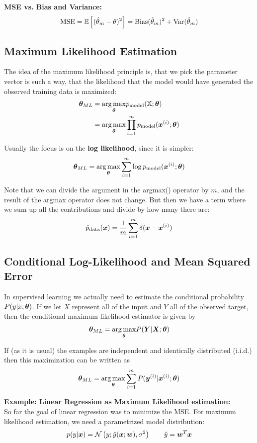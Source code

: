 \begin{multicols}{2}
	\textbf{MSE vs. Bias and Variance:}
	\[ \text{MSE} = \mathbb{E}\left[(\hat{\theta}_m-\theta)^2\right] = \text{Bias}(\hat{\theta}_m)^2+\text{Var}(\hat{\theta}_m) \]
		
		
	\subsection{Maximum Likelihood Estimation}
	The idea of the maximum likelihood principle is, that we pick the parameter vector is such a way, that the likelihood that the model would have generated the observed training data is maximized:
	\begin{align*}
	\bol{\theta}_{ML}
	&= \underset{\bol{\theta}}{\arg \max} p_{\text{model}} (\mathbb{X};\bol{\theta})\\
	&= \underset{\bol{\theta}}{\arg \max} \prod_{i=1}^{m} p_{\text{model}} (\bol{x}^{(i)};\bol{\theta})
	\end{align*}
	
	Usually the focus is on the \textbf{log likelihood}, since it is simpler:
	\[\bol{\theta}_{ML} = \underset{\bol{\theta}}{\arg \max} \sum_{i=1}^{m} \log p_{\text{model}} (\bol{x}^{(i)};\bol{\theta}) \]
	
	Note that we can divide the argument in the argmax() operator by $m$, and the result of the argmax operator does not change. But then we have a term where we sum up all the contributions and divide by how many there are:
	\[ \hat{p}_{\text{data}}(\bol{x}) = \frac{1}{m} \sum_{i=1}^{m} \delta(\bol{x}-\bol{x}^{(i)}) \]
	
	\subsection{Conditional Log-Likelihood and Mean Squared Error}
	In supervised learning we actually need to estimate the conditional probability $P(y|x;\bol{\theta})$.
	If we let $X$ represent all of the input and $Y$ all of the observed target, then the conditional maximum likelihood estimator is given by
	\[ \bol{\theta}_{ML} = \underset{\bol{\theta}}{\arg \max} P(\bol{Y}|\bol{X};\bol{\theta}) \]
	
	If (as it is usual) the examples are independent and identically distributed (i.i.d.) then this maximization can be written as
	\[ \bol{\theta}_{ML} = \underset{\bol{\theta}}{\arg \max} \sum_{i=1}^{m} P(\bol{y}^{(i)}|\bol{x}^{(i)};\bol{\theta}) \]
	
	\textbf{Example: Linear Regression as Maximum Likelihood estimation:}\\
	So far the goal of linear regression was to minimize the MSE.
	For maximum likelihood estimation, we need a parametrized model distribution:
	\[ p(y|\bol{x}) = \mathcal{N}\left(y;\hat{y}(\bol{x};\bol{w}),\sigma^2\right) \qquad 
	\hat{y} = \bol{w}^T\bol{x} \]
	

\end{multicols}
